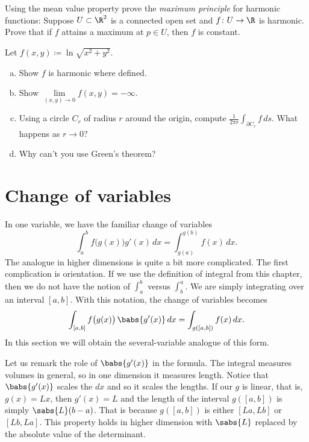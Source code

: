 \begin{exercise}
Using the mean value property prove the
\emph{maximum principle}
for harmonic functions:
Suppose $U \subset \R^2$ is a connected open set and
$f \colon U \to \R$ is harmonic. Prove that
if $f$ attains a maximum at $p \in U$, then $f$ is constant.
\end{exercise}

\begin{exercise}
Let $f(x,y) \coloneqq \ln \sqrt{x^2+y^2}$.
\begin{enumerate}[a)]
\item
Show $f$ is harmonic where defined.
\item
Show $\lim\limits_{(x,y) \to 0} f(x,y) = -\infty$.
\item
Using a circle $C_r$ of radius
$r$ around the origin, compute $\frac{1}{2\pi r} \int_{\partial C_r} f \, ds$.
What happens as $r \to 0$?
\item
Why can't you use Green's theorem?
\end{enumerate}
\end{exercise}



\sectionnewpage
\section{Change of variables}
\label{sec:mvchangeofvars}


In one variable, we have the familiar change of variables
\begin{equation*}
\int_a^b f\bigl(g(x)\bigr) g'(x)\, dx = 
\int_{g(a)}^{g(b)} f(x) \, dx .
\end{equation*}
The analogue in higher dimensions is quite
a bit more complicated.  The first complication is orientation.  If we use
the definition of integral from this chapter, then we do not have the notion
of $\int_a^b$ versus $\int_b^a$.  We are simply integrating over an
interval $[a,b]$.  With this notation, the change of variables becomes
\begin{equation*}
\int_{[a,b]} f\bigl(g(x)\bigr) \, \babs{g'(x)}\, dx = 
\int_{g([a,b])} f(x) \, dx .
\end{equation*}
In this section we will obtain the several-variable analogue of this form.

Let us remark the role of $\babs{g'(x)}$ in the formula. 
The integral measures volumes in general, so in one dimension it measures length.
Notice that $\babs{g'(x)}$ scales the $dx$ and
so it scales the lengths.
If our $g$ is linear, that is, $g(x)=Lx$, then
$g'(x) = L$ and the length of the interval $g([a,b])$ is simply
$\sabs{L}(b-a)$.  That is because $g([a,b])$ is either $[La,Lb]$ or
$[Lb,La]$.  This property holds in higher dimension with $\sabs{L}$ replaced
by the absolute value of the determinant.

